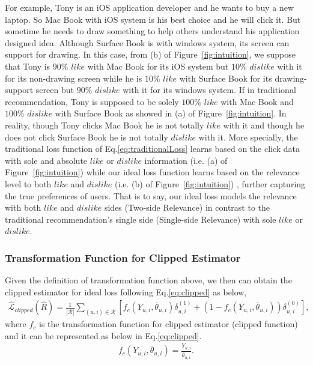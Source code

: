 \documentclass[sigconf]{acmart}
\begin{document}
For example, Tony is an iOS application developer and he wants to buy a new laptop. So Mac Book with iOS system is his best choice and he will click it. But sometime he needs to draw something to help others understand his application designed idea. Although Surface Book is with windows system, its screen can support for drawing. In this case, from (b) of Figure~\ref{fig:intuition}, we suppose that Tony is $90\%$ $like$ with Mac Book for its iOS system but $10\%$ $dislike$ with it for its non-drawing screen while he is $10\%$ $like$ with Surface Book for its drawing-support screen but $90\%$ $dislike$ with it for its windows system. If in traditional recommendation, Tony is supposed to be solely $100\%$ $like$ with Mac Book and $100\%$ $dislike$ with Surface Book as showed in (a) of Figure~\ref{fig:intuition}. In reality, though Tony clicks Mac Book he is not totally $like$ with it and though he does not click Surface Book he is not totally $dislike$ with it. More specially, the traditional loss function of Eq.\eqref{eq:traditionalLoss} learns based on the click data with sole and absolute $like$ or $dislike$ information (i.e. (a) of Figure~\ref{fig:intuition}) while our ideal loss function learns based on the relevance level to both $like$ and $dislike$ (i.e. (b) of Figure~\ref{fig:intuition}) , further capturing the true preferences of users. That is to say, our ideal loss models the relevance with both $like$ and $dislike$ sides (Two-side Relevance) in contrast to the traditional recommendation's single side (Single-side Relevance) with sole $like$ or $dislike$. 
\subsubsection{Transformation Function for Clipped Estimator}

Given the definition of transformation function above, we then can obtain the clipped estimator for ideal loss following Eq.\eqref{eq:clipped} as below, 
\begin{eqnarray}\label{eq:clippedTFLoss}
	\hat{\mathcal{L}}_{clipped}(\hat{R})  = \frac{1}{|\mathcal{R}|} \sum_{(u, i) \in \mathcal{R}}^{} \left[f_{c}({Y_{u,i}}, {\bar{\theta}_{u,i}}) \delta_{u, i}^{(1)} +\left(1 - f_{c}({Y_{u,i}}, {\bar{\theta}_{u,i}})\right)\delta_{u, i}^{(0)} \right] ,
\end{eqnarray}
where $f_{c}$ is the transformation function for clipped estimator (clipped function) and it can be represented as below in Eq.\eqref{eq:clipped}.
\begin{eqnarray}\label{eq:clippedTF}
	f_{c}({Y_{u,i}}, {\bar{\theta}_{u,i}}) =  \frac{Y_{u,i}}{\bar{\theta}_{u,i}}.
\end{eqnarray}
\end{document}
